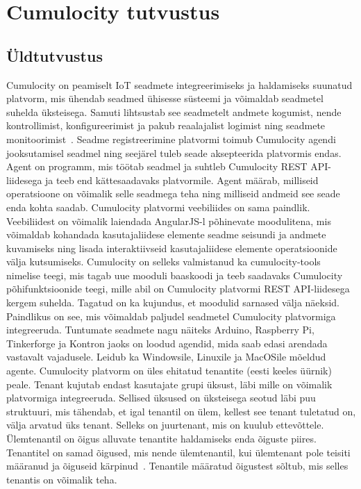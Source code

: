 \documentclass[12pt]{article}
\newcommand{\newlinespacer}{{%
    \newline
    \newline
  }}%
\begin{document}
  
  
  
  
  \newpage
  \section{Cumulocity tutvustus} 
  
  
  \subsection{Üldtutvustus}
  
  Cumulocity on peamiselt IoT seadmete integreerimiseks ja haldamiseks
  suunatud platvorm, mis ühendab seadmed ühisesse süsteemi
  ja võimaldab seadmetel suhelda üksteisega. Samuti lihtsustab see seadmetelt andmete kogumist,
  nende kontrollimist, konfigureerimist ja pakub
  reaalajalist logimist ning seadmete monitoorimist~\cite{CumulocityConceptsInterfaceingDevices,
  CumulocityConceptsDomainModel}.
  Seadme registreerimine platvormi toimub Cumulocity
  agendi jooksutamisel seadmel ning seejärel tuleb seade aksepteerida platvormis endas. Agent on
  programm, mis töötab seadmel ja suhtleb Cumulocity REST API-liidesega ja teeb end kättesaadavaks
  platvormile.
  Agent määrab, milliseid operatsioone on võimalik selle seadmega teha ning milliseid andmeid see
  seade enda kohta saadab.
  \newlinespacer
  Cumulocity platvormi veebiliides on sama paindlik. Veebiliidest on võimalik laiendada AngularJS-l
  põhinevate moodulitena, mis võimaldab kohandada kasutajaliidese elemente seadme seisundi ja
  andmete kuvamiseks ning lisada interaktiivseid kasutajaliidese elemente operatsioonide välja
  kutsumiseks.
  Cumulocity on selleks valmistanud ka cumulocity-tools nimelise teegi,
  mis tagab uue mooduli baaskoodi ja teeb saadavaks Cumulocity põhifunktsioonide teegi, mille abil
  on Cumulocity platvormi REST API-liidesega kergem suhelda. Tagatud on ka kujundus, et moodulid
  sarnased välja näeksid.
  \newlinespacer
  Paindlikus on see, mis võimaldab paljudel seadmetel Cumulocity platvormiga integreeruda. Tuntumate
  seadmete nagu näiteks Arduino, Raspberry Pi, Tinkerforge ja Kontron jaoks on loodud agendid, mida
  saab edasi arendada vastavalt vajadusele. Leidub ka Windowsile, Linuxile ja MacOSile mõeldud agente.
  \newlinespacer
  Cumulocity platvorm on üles ehitatud tenantite (eesti keeles üürnik) peale.
  Tenant kujutab endast kasutajate grupi üksust, läbi mille on võimalik platvormiga integreeruda.
  Sellised üksused on üksteisega seotud läbi puu struktuuri, mis tähendab, et
  igal tenantil on ülem, kellest see tenant tuletatud on, välja arvatud üks tenant.
  Selleks on juurtenant, mis on kuulub ettevõttele. Ülemtenantil on õigus alluvate
  tenantite haldamiseks enda õiguste piires. Tenantitel on samad õigused,
  mis nende ülemtenantil, kui ülemtenant pole teisiti määranud ja õiguseid
  kärpinud~\cite{CumulocityUsersGuideAdministration}.
  Tenantile määratud õigustest sõltub, mis selles tenantis on võimalik teha.
\end{document}
